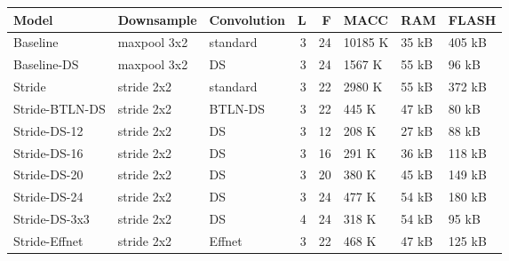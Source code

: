 \begin{tabular}{lllrrlll}
\toprule
          Model &   Downsample & Convolution &  L &   F &     MACC &    RAM &   FLASH \\
\midrule
       Baseline &  maxpool 3x2 &    standard &  3 &  24 &  10185 K &  35 kB &  405 kB \\
    Baseline-DS &  maxpool 3x2 &          DS &  3 &  24 &   1567 K &  55 kB &   96 kB \\
         Stride &   stride 2x2 &    standard &  3 &  22 &   2980 K &  55 kB &  372 kB \\
 Stride-BTLN-DS &   stride 2x2 &     BTLN-DS &  3 &  22 &    445 K &  47 kB &   80 kB \\
   Stride-DS-12 &   stride 2x2 &          DS &  3 &  12 &    208 K &  27 kB &   88 kB \\
   Stride-DS-16 &   stride 2x2 &          DS &  3 &  16 &    291 K &  36 kB &  118 kB \\
   Stride-DS-20 &   stride 2x2 &          DS &  3 &  20 &    380 K &  45 kB &  149 kB \\
   Stride-DS-24 &   stride 2x2 &          DS &  3 &  24 &    477 K &  54 kB &  180 kB \\
  Stride-DS-3x3 &   stride 2x2 &          DS &  4 &  24 &    318 K &  54 kB &   95 kB \\
  Stride-Effnet &   stride 2x2 &      Effnet &  3 &  22 &    468 K &  47 kB &  125 kB \\
\bottomrule
\end{tabular}
